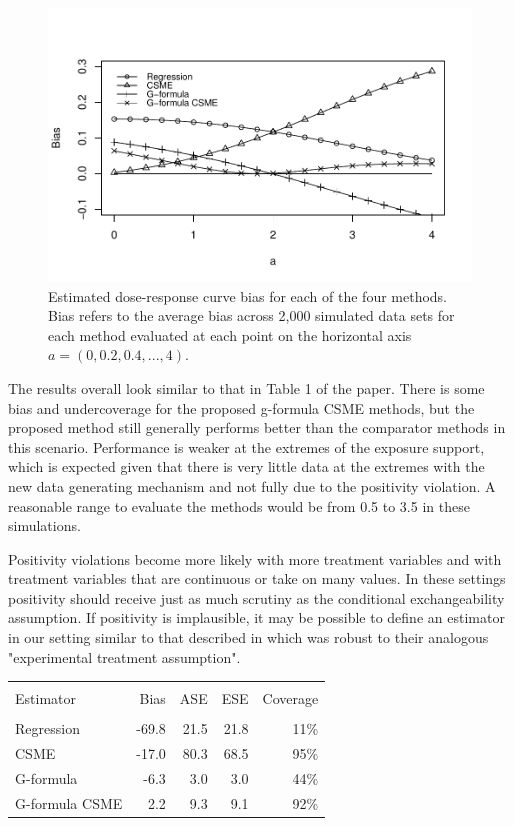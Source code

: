 \documentclass[12pt]{article}
\newcounter{tblcap}
\def\tblhead#1{\hline\\[-9pt]#1\\\hline\\[-9.75pt]}
\def\lastline{\\\hline}
\begin{document}
\begin{figure}
\centering
\includegraphics[width=6in]{app_fig2.pdf}
\caption{Estimated dose-response curve bias for each of the four methods. Bias refers to the average bias across 2,000 simulated data sets for each method evaluated at each point on the horizontal axis $a = (0, 0.2, 0.4, ..., 4)$.}
\end{figure}

The results overall look similar to that in Table 1 of the paper. There is some bias and undercoverage for the proposed g-formula CSME methods, but the proposed method still generally performs better than the comparator methods in this scenario. Performance is weaker at the extremes of the exposure support, which is expected given that there is very little data at the extremes with the new data generating mechanism and not fully due to the positivity violation. A reasonable range to evaluate the methods would be from 0.5 to 3.5 in these simulations.

Positivity violations become more likely with more treatment variables and with treatment variables that are continuous or take on many values. In these settings positivity should receive just as much scrutiny as the conditional exchangeability assumption. If positivity is implausible, it may be possible to define an estimator in our setting similar to that described in \citet{neugebauer2005} which was robust to their analogous "experimental treatment assumption".

\begin{table}[h]
{\tabcolsep=4.25pt
\begin{tabular}{@{}lrrrr@{}}
\tblhead{Estimator & Bias & ASE & ESE & Coverage}
Regression & -69.8 & 21.5 & 21.8 & 11\% \\
CSME & -17.0 & 80.3 & 68.5 & 95\% \\
G-formula & -6.3 & 3.0 & 3.0 & 44\% \\
G-formula CSME & 2.2 & 9.3 & 9.1 & 92\%
\lastline
\end{tabular}}
\end{table}
\end{document}
